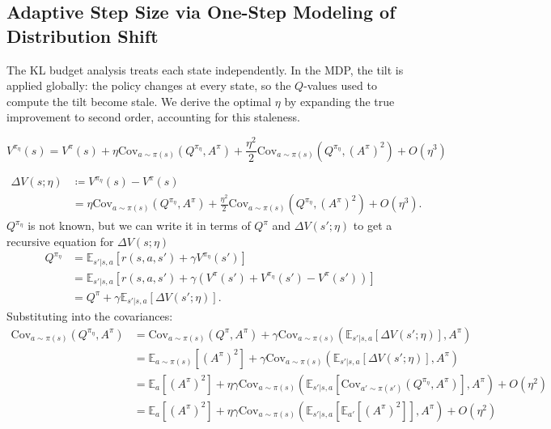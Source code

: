 \documentclass{article}
\theoremstyle{plain}
\theoremstyle{definition}
\theoremstyle{remark}
\newcommand{\E}{\mathbb{E}}
\begin{document}
\subsection{Adaptive Step Size via One-Step Modeling of Distribution Shift}
\label{sec:optimal-eta}

The KL budget analysis treats each state independently. In the MDP, the tilt is applied globally: the policy changes at every state, so the $Q$-values used to compute the tilt become stale. We derive the optimal $\eta$ by expanding the true improvement to second order, accounting for this staleness.

\begin{equation}\label{eq:V_pi_eta}
  V^{\pi_\eta}(s) = V^\pi(s) + \eta\mathrm{Cov}_{a\sim\pi(s)}(Q^{\pi_\eta},A^\pi) + \frac{\eta^2}{2}\mathrm{Cov}_{a\sim\pi(s)}(Q^{\pi_\eta},(A^\pi)^2) + O(\eta^3)
\end{equation}

\begin{align}
  \Delta V(s;\eta) 
  &\coloneqq V^{\pi_\eta}(s) - V^\pi(s) \nonumber\\
  &= \eta\mathrm{Cov}_{a\sim\pi(s)}(Q^{\pi_\eta},A^\pi) + \frac{\eta^2}{2}\mathrm{Cov}_{a\sim\pi(s)}(Q^{\pi_\eta},(A^\pi)^2) + O(\eta^3).
\end{align}
$Q^{\pi_\eta}$ is not known, but we can write it in terms of $Q^\pi$ and $\Delta V(s';\eta)$ to get a recursive equation for $\Delta V(s;\eta)$
\begin{align}
  Q^{\pi_\eta}
  &= \E_{s'|s,a}[r(s,a,s') + \gamma V^{\pi_\eta}(s')]\nonumber\\
  &= \E_{s'|s,a}[r(s,a,s') + \gamma(V^\pi(s') + V^{\pi_\eta}(s') -V^\pi(s'))]\nonumber\\
  &= Q^\pi + \gamma \E_{s'|s,a}[\Delta V(s';\eta)].
\end{align}
Substituting into the covariances:
\begin{align}
    \mathrm{Cov}_{a\sim\pi(s)}(Q^{\pi_\eta},A^\pi) 
    &= \mathrm{Cov}_{a\sim\pi(s)}(Q^\pi,A^\pi) + \gamma\mathrm{Cov}_{a\sim\pi(s)}(\E_{s'|s,a}[\Delta V(s';\eta)],A^\pi)\nonumber\\
    &= \E_{a\sim\pi(s)}[(A^\pi)^2] + \gamma\mathrm{Cov}_{a\sim\pi(s)}(\E_{s'|s,a}[\Delta V(s';\eta)],A^\pi)\nonumber\\
    &= \E_a[(A^\pi)^2] + \eta\gamma\mathrm{Cov}_{a\sim\pi(s)}(\E_{s'|s,a}[\mathrm{Cov}_{a'\sim\pi(s')}(Q^{\pi_\eta},A^\pi)],A^\pi) + O(\eta^2)\nonumber\\
    &= \E_a[(A^\pi)^2] + \eta\gamma\mathrm{Cov}_{a\sim\pi(s)}(\E_{s'|s,a}[\E_{a'}[(A^\pi)^2]],A^\pi) + O(\eta^2)
\end{align}
\end{document}
